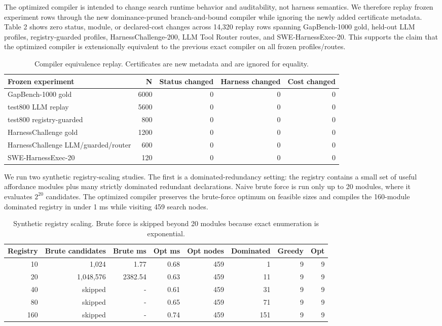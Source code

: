 \documentclass[
  10pt,
]{article}
\begin{document}
The optimized compiler is intended to change search runtime behavior and
auditability, not harness semantics. We therefore replay frozen
experiment rows through the new dominance-pruned branch-and-bound
compiler while ignoring the newly added certificate metadata. Table 2
shows zero status, module, or declared-cost changes across 14,320 replay
rows spanning GapBench-1000 gold, held-out LLM profiles,
registry-guarded profiles, HarnessChallenge-200, LLM Tool Router routes,
and SWE-HarnessExec-20. This supports the claim that the optimized
compiler is extensionally equivalent to the previous exact compiler on
all frozen profiles/routes.

\begin{table}[H]
\centering
\scriptsize
\caption{Compiler equivalence replay. Certificates are new metadata and are ignored for equality.}
\label{tab:replay}
\begin{tabular}{lrrrr}
\toprule
Frozen experiment & N & Status changed & Harness changed & Cost changed\\
\midrule
GapBench-1000 gold & 6000 & 0 & 0 & 0\\
test800 LLM replay & 5600 & 0 & 0 & 0\\
test800 registry-guarded & 800 & 0 & 0 & 0\\
HarnessChallenge gold & 1200 & 0 & 0 & 0\\
HarnessChallenge LLM/guarded/router & 600 & 0 & 0 & 0\\
SWE-HarnessExec-20 & 120 & 0 & 0 & 0\\
\bottomrule
\end{tabular}
\end{table}

We run two synthetic registry-scaling studies. The first is a
dominated-redundancy setting: the registry contains a small set of
useful affordance modules plus many strictly dominated redundant
declarations. Naive brute force is run only up to 20 modules, where it
evaluates \(2^{20}\) candidates. The optimized compiler preserves the
brute-force optimum on feasible sizes and compiles the 160-module
dominated registry in under 1 ms while visiting 459 search nodes.

\begin{table}[H]
\centering
\scriptsize
\caption{Synthetic registry scaling. Brute force is skipped beyond 20 modules because exact enumeration is exponential.}
\label{tab:scaling}
\begin{tabular}{rrrrrrrr}
\toprule
Registry & Brute candidates & Brute ms & Opt ms & Opt nodes & Dominated & Greedy & Opt\\
\midrule
10 & 1,024 & 1.77 & 0.68 & 459 & 1 & 9 & 9\\
20 & 1,048,576 & 2382.54 & 0.63 & 459 & 11 & 9 & 9\\
40 & skipped & - & 0.61 & 459 & 31 & 9 & 9\\
80 & skipped & - & 0.65 & 459 & 71 & 9 & 9\\
160 & skipped & - & 0.74 & 459 & 151 & 9 & 9\\
\bottomrule
\end{tabular}
\end{table}
\end{document}
